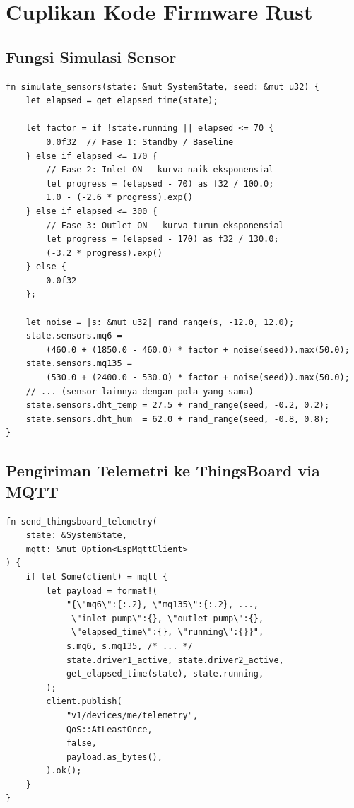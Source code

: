 \documentclass[12pt,a4paper]{report}
\begin{document}
\section{Cuplikan Kode Firmware Rust}

\subsection{Fungsi Simulasi Sensor}

\begin{lstlisting}[language={[ANSI]C},
    caption={Fungsi \texttt{simulate\_sensors()} --- kalkulasi respons sensor
             per fase dalam Rust (esp32\_simulation/src/main.rs).}]
fn simulate_sensors(state: &mut SystemState, seed: &mut u32) {
    let elapsed = get_elapsed_time(state);

    let factor = if !state.running || elapsed <= 70 {
        0.0f32  // Fase 1: Standby / Baseline
    } else if elapsed <= 170 {
        // Fase 2: Inlet ON - kurva naik eksponensial
        let progress = (elapsed - 70) as f32 / 100.0;
        1.0 - (-2.6 * progress).exp()
    } else if elapsed <= 300 {
        // Fase 3: Outlet ON - kurva turun eksponensial
        let progress = (elapsed - 170) as f32 / 130.0;
        (-3.2 * progress).exp()
    } else {
        0.0f32
    };

    let noise = |s: &mut u32| rand_range(s, -12.0, 12.0);
    state.sensors.mq6 =
        (460.0 + (1850.0 - 460.0) * factor + noise(seed)).max(50.0);
    state.sensors.mq135 =
        (530.0 + (2400.0 - 530.0) * factor + noise(seed)).max(50.0);
    // ... (sensor lainnya dengan pola yang sama)
    state.sensors.dht_temp = 27.5 + rand_range(seed, -0.2, 0.2);
    state.sensors.dht_hum  = 62.0 + rand_range(seed, -0.8, 0.8);
}
\end{lstlisting}

\subsection{Pengiriman Telemetri ke ThingsBoard via MQTT}

\begin{lstlisting}[language={[ANSI]C},
    caption={Fungsi \texttt{send\_thingsboard\_telemetry()} --- publish MQTT ke
             ThingsBoard Cloud tiap 1 detik.}]
fn send_thingsboard_telemetry(
    state: &SystemState,
    mqtt: &mut Option<EspMqttClient>
) {
    if let Some(client) = mqtt {
        let payload = format!(
            "{\"mq6\":{:.2}, \"mq135\":{:.2}, ...,
             \"inlet_pump\":{}, \"outlet_pump\":{},
             \"elapsed_time\":{}, \"running\":{}}",
            s.mq6, s.mq135, /* ... */
            state.driver1_active, state.driver2_active,
            get_elapsed_time(state), state.running,
        );
        client.publish(
            "v1/devices/me/telemetry",
            QoS::AtLeastOnce,
            false,
            payload.as_bytes(),
        ).ok();
    }
}
\end{lstlisting}
\end{document}
